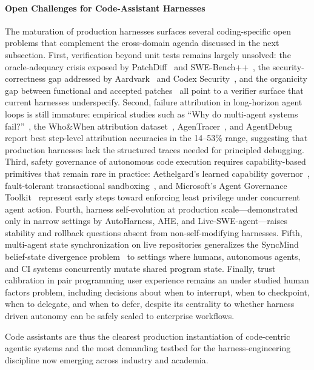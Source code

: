 \documentclass{llmxive}
\begin{document}
\paragraph{Open Challenges for Code-Assistant Harnesses}
The maturation of production harnesses surfaces several coding-specific open problems that complement the cross-domain agenda discussed in the next subsection.
First, verification beyond unit tests remains largely unsolved: the oracle-adequacy crisis exposed by PatchDiff~\citep{wang2025solved} and SWE-Bench++~\citep{anonymous2025swebenchpp}, the security-correctness gap addressed by Aardvark~\citep{openai2025aardvark} and Codex Security~\citep{openai2026codexsecurity}, and the organicity gap between functional and accepted patches~\citep{li2026learning,thillen2026codetaste} all point to a verifier surface that current harnesses underspecify.
Second, failure attribution in long-horizon agent loops is still immature: empirical studies such as ``Why do multi-agent systems fail?''~\citep{cemri2025whymas}, the Who\&When attribution dataset~\citep{zhang2025whoandwhen}, AgenTracer~\citep{agentracer2025}, and AgentDebug~\citep{zhu2025llm} report best step-level attribution accuracies in the 14--53\% range, suggesting that production harnesses lack the structured traces needed for principled debugging.
Third, safety governance of autonomous code execution requires capability-based primitives that remain rare in practice: Aethelgard's learned capability governor~\citep{anonymous2026aethelgard}, fault-tolerant transactional sandboxing~\citep{anonymous2025faultsandbox}, and Microsoft's Agent Governance Toolkit~\citep{microsoft2026governance} represent early steps toward enforcing least privilege under concurrent agent action.
Fourth, harness self-evolution at production scale---demonstrated only in narrow settings by AutoHarness, AHE, and Live-SWE-agent---raises stability and rollback questions absent from non-self-modifying harnesses.
Fifth, multi-agent state synchronization on live repositories generalizes the SyncMind belief-state divergence problem~\citep{Guo2025SyncMind} to settings where humans, autonomous agents, and CI systems concurrently mutate shared program state.
Finally, trust calibration in pair programming user experience remains an under studied human factors problem, including decisions about when to interrupt, when to checkpoint, when to delegate, and when to defer, despite its centrality to whether harness driven autonomy can be safely scaled to enterprise workflows.

Code assistants are thus the clearest production instantiation of code-centric agentic systems and the most demanding testbed for the harness-engineering discipline now emerging across industry and academia.
\end{document}
